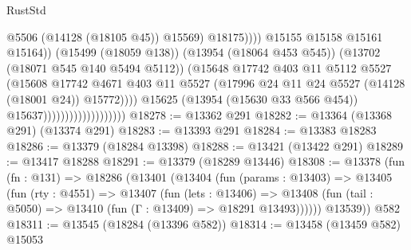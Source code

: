 \begin{lexlean}{RustStd}
\begin{coremodule}
                                                          @5506
                                                          (@14128 (@18105 @45))
                                                          @15569)
                                                        @18175))))
                                                @15155
                                                @15158
                                                @15161
                                                @15164))
                                            (@15499 (@18059 @138))
                                            (@13954 (@18064 @453 @545))
                                            (@13702 (@18071 @545 @140 @5494 @5112))
                                            (@15648
                                              @17742
                                              @403
                                              @11
                                              @5112
                                              @5527
                                              (@15608
                                                @17742
                                                @4671
                                                @403
                                                @11
                                                @5527
                                                (@17996
                                                  @24
                                                  @11
                                                  @24
                                                  @5527
                                                  (@14128 (@18001 @24))
                                                  @15772))))
                                          @15625
                                          (@13954 (@15630 @33 @566 @454))
                                          @15637)))))))))))))))))))
@18278 := @13362 @291
@18282 := @13364 (@13368 @291) (@13374 @291)
@18283 := @13393 @291
@18284 := @13383 @18283
@18286 := @13379 (@18284 @13398)
@18288 := @13421 (@13422 @291)
@18289 := @13417 @18288
@18291 := @13379 (@18289 @13446)
@18308 := @13378
    (fun (fn : @131) =>
    @18286
      (@13401
        (@13404
          (fun (params : @13403) =>
          @13405
            (fun (rty : @4551) =>
            @13407
              (fun (lets : @13406) =>
              @13408 (fun (tail : @5050) => @13410 (fun (Γ : @13409) => @18291 @13493))))))
        @13539))
    @582
@18311 := @13545 (@18284 (@13396 @582))
@18314 := @13458 (@13459 @582) @15053

\end{coremodule}
\end{lexlean}
